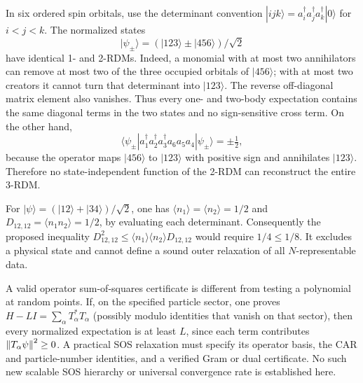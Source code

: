 \begin{example}
\label{ex:three-rdm}
In six ordered spin orbitals, use the determinant convention
$|ijk\rangle=a_i^\dagger a_j^\dagger a_k^\dagger|0\rangle$ for
$i<j<k$. The normalized states
\[
 |\psi_\pm\rangle=(|123\rangle\pm|456\rangle)/\sqrt2
\]
have identical 1- and 2-RDMs. Indeed, a monomial with at most two annihilators
can remove at most two of the three occupied orbitals of $|456\rangle$;
with at most two creators it cannot turn that determinant into $|123\rangle$.
The reverse off-diagonal matrix element also vanishes. Thus every one- and
two-body expectation contains the same diagonal terms in the two states and
no sign-sensitive cross term. On the other hand,
\[
 \langle\psi_\pm|
 a_1^\dagger a_2^\dagger a_3^\dagger a_6a_5a_4
 |\psi_\pm\rangle=\pm\tfrac12,
\]
because the operator maps $|456\rangle$ to $|123\rangle$ with positive
sign and annihilates $|123\rangle$. Therefore no state-independent function
of the 2-RDM can reconstruct the entire 3-RDM.
\end{example}

\begin{example}
For $|\psi\rangle=(|12\rangle+|34\rangle)/\sqrt2$, one has
$\langle n_1\rangle=\langle n_2\rangle=1/2$ and
$D_{12,12}=\langle n_1n_2\rangle=1/2$, by evaluating each determinant.
Consequently the proposed inequality
$D_{12,12}^2\le\langle n_1\rangle\langle n_2\rangle D_{12,12}$
would require $1/4\le1/8$. It excludes a physical state and cannot define a
sound outer relaxation of all $N$-representable data.
\end{example}

A valid operator sum-of-squares certificate is different from testing a
polynomial at random points. If, on the specified particle sector, one proves
$H-LI=\sum_\alpha T_\alpha^*T_\alpha$ (possibly modulo identities
that vanish on that sector), then every normalized expectation is at least
$L$, since each term contributes $\left\lVert T_\alpha\psi\right\rVert^2\ge0$.
A practical SOS relaxation must specify its operator basis, the CAR and
particle-number identities, and a verified Gram or dual certificate. No such
new scalable SOS hierarchy or universal convergence rate is established here.
